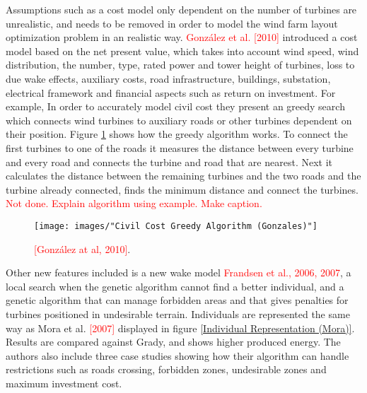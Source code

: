 Assumptions such as a cost model only dependent on the number of turbines are unrealistic, and needs to be removed in order to model the wind farm layout optimization problem in an realistic way. \textcolor{red}{González et al. [2010]} introduced a cost model based on the net present value, which takes into account wind speed, wind distribution, the number, type, rated power and tower height of turbines, loss to due wake effects, auxiliary costs, road infrastructure, buildings, substation, electrical framework and financial aspects such as return on investment. For example, In order to accurately model civil cost they present an greedy search which connects wind turbines to auxiliary roads or other turbines dependent on their position. Figure \ref{Civil Cost Greedy Algorithm (Gonzales)} shows how the greedy algorithm works. To connect the first turbines to one of the roads it measures the distance between every turbine and every road and connects the turbine and road that are nearest. Next it calculates the distance between the remaining turbines and the two roads and the turbine already connected, finds the minimum distance and connect the turbines. \textcolor{red}{Not done. Explain algorithm using example. Make caption.}


\begin{figure}[h!]
\begin{center}
\texttt{[image: images/"Civil Cost Greedy Algorithm (Gonzales)"]}
\caption{ \textcolor{red}{[González at al, 2010]}.}
\label{Civil Cost Greedy Algorithm (Gonzales)}
\end{center}
\end{figure}


\noindent Other new features included is a new wake model \textcolor{red}{Frandsen et al., 2006, 2007}, a local search when the genetic algorithm cannot find a better individual, and a genetic algorithm that can manage forbidden areas and that gives penalties for turbines positioned in undesirable terrain. Individuals are represented the same way as Mora et al. \textcolor{red}{[2007]} displayed in figure \ref{Individual Representation (Mora)}. Results are compared against Grady, and shows higher produced energy. The authors also include three case studies showing how their algorithm can handle restrictions such as roads crossing, forbidden zones, undesirable zones and maximum investment cost.\\


